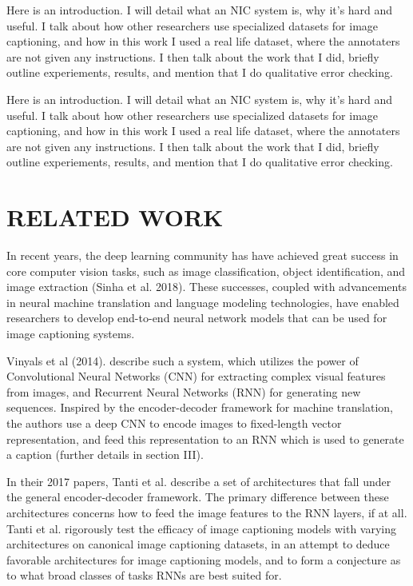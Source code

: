 \documentclass[letterpaper, 10 pt, conference]{ieeeconf}
\begin{document}
Here is an introduction. I will detail what an NIC system is, why it's hard and useful. I talk about how other researchers use specialized datasets for image captioning, and how in this work I used a real life dataset, where the annotaters are not given any instructions. I then talk about the work that I did, briefly outline experiements, results, and mention that I do qualitative error checking. 

Here is an introduction. I will detail what an NIC system is, why it's hard and useful. I talk about how other researchers use specialized datasets for image captioning, and how in this work I used a real life dataset, where the annotaters are not given any instructions. I then talk about the work that I did, briefly outline experiements, results, and mention that I do qualitative error checking. 

\section{RELATED WORK}

In recent years, the deep learning community has have achieved great success in core computer vision tasks, such as image classification, object identification, and image extraction (Sinha et al. 2018). These successes, coupled with advancements in neural machine translation and language modeling technologies, have enabled researchers to develop end-to-end neural network models that can be used for image captioning systems. 

Vinyals et al (2014). describe such a system, which utilizes the power of Convolutional Neural Networks (CNN) for extracting complex visual features from images, and Recurrent Neural Networks (RNN) for generating new sequences. Inspired by the encoder-decoder framework for machine translation, the authors use a deep CNN to encode images to fixed-length vector representation, and feed this representation to an RNN which is used to generate a caption (further details in section III). 


In their 2017 papers, Tanti et al. describe a set of architectures that fall under the general encoder-decoder framework. The primary difference between these architectures concerns how to feed the image features to the RNN layers, if at all. Tanti et al. rigorously test the efficacy of image captioning models with varying architectures on canonical image captioning datasets, in an attempt to deduce favorable architectures for image captioning models, and to form a conjecture as to what broad classes of tasks RNNs are best suited for.
\end{document}
